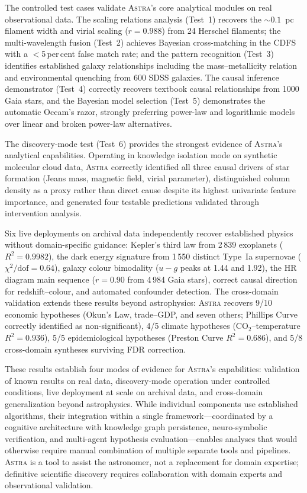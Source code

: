 \documentclass[usenatbib]{rasti}
\newcommand{\astra}{\textsc{Astra}\xspace}
\begin{document}
The controlled test cases validate \astra's core analytical modules on real observational data.
The scaling relations analysis (Test~1) recovers the ${\sim}0.1$~pc filament width and virial scaling ($r = 0.988$) from 24 Herschel filaments; the multi-wavelength fusion (Test~2) achieves Bayesian cross-matching in the CDFS with a $<$5\,per\,cent false match rate; and the pattern recognition (Test~3) identifies established galaxy relationships including the mass--metallicity relation and environmental quenching from 600 SDSS galaxies.
The causal inference demonstrator (Test~4) correctly recovers textbook causal relationships from 1000 Gaia stars, and the Bayesian model selection (Test~5) demonstrates the automatic Occam's razor, strongly preferring power-law and logarithmic models over linear and broken power-law alternatives.

The discovery-mode test (Test~6) provides the strongest evidence of \astra's analytical capabilities.
Operating in knowledge isolation mode on synthetic molecular cloud data, \astra correctly identified all three causal drivers of star formation (Jeans mass, magnetic field, virial parameter), distinguished column density as a proxy rather than direct cause despite its highest univariate feature importance, and generated four testable predictions validated through intervention analysis.

Six live deployments on archival data independently recover established physics without domain-specific guidance: Kepler's third law from 2\,839 exoplanets ($R^{2}=0.9982$), the dark energy signature from 1\,550 distinct Type~Ia supernovae ($\chi^{2}/\mathrm{dof}=0.64$), galaxy colour bimodality ($u{-}g$ peaks at 1.44 and 1.92), the HR diagram main sequence ($r=0.90$ from 4\,984 Gaia stars), correct causal direction for redshift--colour, and automated confounder detection.
The cross-domain validation extends these results beyond astrophysics: \astra recovers 9/10 economic hypotheses (Okun's Law, trade--GDP, and seven others; Phillips Curve correctly identified as non-significant), 4/5 climate hypotheses (CO$_{2}$--temperature $R^{2}=0.936$), 5/5 epidemiological hypotheses (Preston Curve $R^{2}=0.686$), and 5/8 cross-domain syntheses surviving FDR correction.

These results establish four modes of evidence for \astra's capabilities: validation of known results on real data, discovery-mode operation under controlled conditions, live deployment at scale on archival data, and cross-domain generalization beyond astrophysics.
While individual components use established algorithms, their integration within a single framework---coordinated by a cognitive architecture with knowledge graph persistence, neuro-symbolic verification, and multi-agent hypothesis evaluation---enables analyses that would otherwise require manual combination of multiple separate tools and pipelines.
\astra is a tool to assist the astronomer, not a replacement for domain expertise; definitive scientific discovery requires collaboration with domain experts and observational validation.
\end{document}
